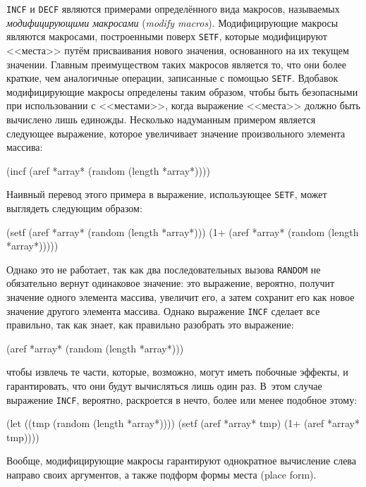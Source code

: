 \lstinline{INCF} и \lstinline{DECF} являются примерами определённого вида макросов, называемых
\textit{модифицирующими макросами} (\textit{modify macros}). Модифицирующие макросы
являются макросами, построенными поверх \lstinline{SETF}, которые модифицируют <<места>> путём
присваивания нового значения, основанного на их текущем значении. Главным преимуществом
таких макросов является то, что они более краткие, чем аналогичные операции, записанные с
помощью \lstinline{SETF}. Вдобавок модифицирующие макросы определены таким образом, чтобы
быть безопасными при использовании с <<местами>>, когда выражение <<места>> должно быть
вычислено лишь единожды. Несколько надуманным примером является следующее выражение,
которое увеличивает значение произвольного элемента массива:

\begin{myverb}
(incf (aref *array* (random (length *array*))))
\end{myverb}

Наивный перевод этого примера в выражение, использующее \lstinline{SETF}, может выглядеть
следующим образом:

\begin{myverb}
(setf (aref *array* (random (length *array*)))
      (1+ (aref *array* (random (length *array*)))))
\end{myverb}

Однако это не работает, так как два последовательных вызова \lstinline{RANDOM} не
обязательно вернут одинаковое значение: это выражение, вероятно, получит значение одного
элемента массива, увеличит его, а затем сохранит его как новое значение другого элемента
массива. Однако выражение \lstinline{INCF} сделает все правильно, так как знает, как
правильно разобрать это выражение:

\begin{myverb}
(aref *array* (random (length *array*)))
\end{myverb}

\noindent{}чтобы извлечь те части, которые, возможно, могут иметь побочные эффекты, и гарантировать,
что они будут вычисляться лишь один раз. В~этом случае выражение \lstinline{INCF}, вероятно,
раскроется в нечто, более или менее подобное этому:

\begin{myverb}
(let ((tmp (random (length *array*))))
  (setf (aref *array* tmp) (1+ (aref *array* tmp))))
\end{myverb}

Вообще, модифицирующие макросы гарантируют однократное вычисление слева направо своих
аргументов, а также подформ формы места (place form).

